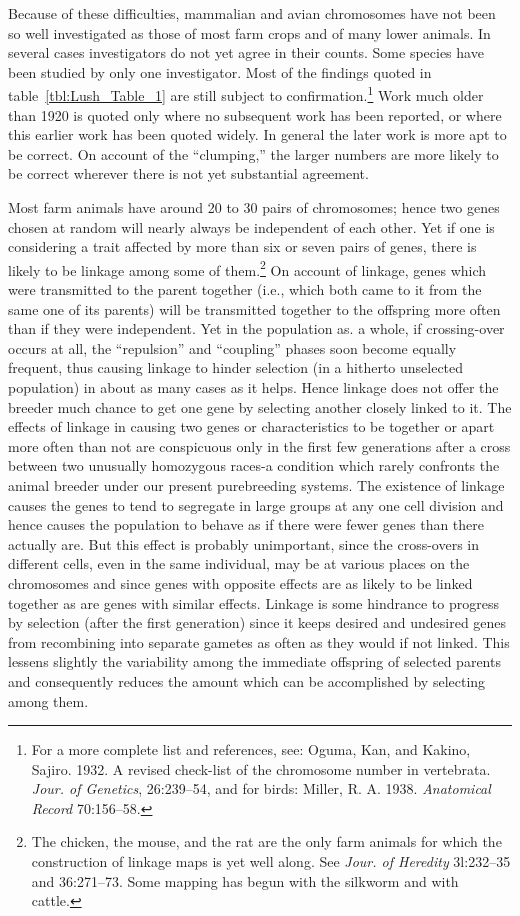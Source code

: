 Because of these difficulties, mammalian and avian chromosomes
have not been so well investigated as those of most farm crops and of
many lower animals. In several cases investigators do not yet agree in
their counts. Some species have been studied by only one investigator.
Most of the findings quoted in table~\ref{tbl:Lush_Table_1} are still subject to confirmation.\footnote{For a
more complete list and references, see: Oguma, Kan, and Kakino, Sajiro.
1932. A revised check-list of the chromosome number in vertebrata. \textit{Jour. of Genetics},
26:239--54, and for birds: Miller, R. A. 1938. \textit{Anatomical Record} 70:156--58.}
Work much older than 1920 is quoted only where no subsequent work
has been reported, or where this earlier work has been quoted widely.
In general the later work is more apt to be correct. On account of the
``clumping,'' the larger numbers are more likely to be correct wherever
there is not yet substantial agreement.

Most farm animals have around 20 to 30 pairs of chromosomes;
hence two genes chosen at random will nearly always be independent of
each other. Yet if one is considering a trait affected by more than six or
seven pairs of genes, there is likely to be linkage among some of them.\footnote{The
chicken, the mouse, and the rat are the only farm animals for which the
construction of linkage maps is yet well along. See \textit{Jour. of Heredity} 3l:232--35 and
36:271--73. Some mapping has begun with the silkworm and with cattle.}
On account of linkage, genes which were transmitted to the parent
together (i.e., which both came to it from the same one of its parents)
will be transmitted together to the offspring more often than if they
were independent. Yet in the population as. a whole, if crossing-over
occurs at all,  the ``repulsion'' and ``coupling'' phases soon become equally
frequent, thus causing linkage to hinder selection (in a hitherto
unselected population) in about as many cases as it helps. Hence linkage
does not offer the breeder much chance to get one gene by selecting
another closely linked to it. The effects of linkage in causing two genes
or characteristics to be together or apart more often than not are conspicuous
only in the first few generations after a cross between two
unusually homozygous races-a condition which rarely confronts the
animal breeder under our present purebreeding systems. The existence
of linkage causes the genes to tend to segregate in large groups at any
one cell division and hence causes the population to behave as if there
were fewer genes than there actually are. But this effect is probably
unimportant, since the cross-overs in different cells, even in the same
individual, may be at various places on the chromosomes and since
genes with opposite effects are as likely to be linked together as are
genes with similar effects. Linkage is some hindrance to progress by
selection (after the first generation) since it keeps desired and undesired
genes from recombining into separate gametes as often as they
would if not linked. This lessens slightly the variability among the
immediate offspring of selected parents and consequently reduces the
amount which can be accomplished by selecting among them.

